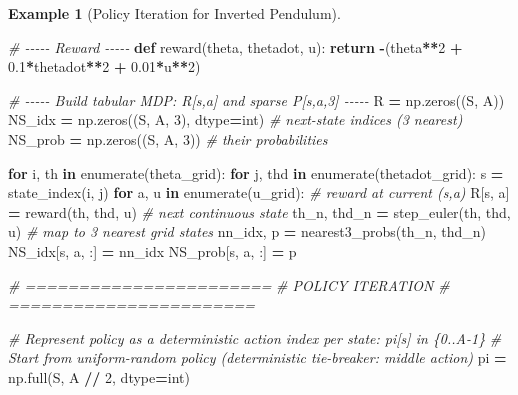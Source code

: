 \documentclass[
]{book}
\newenvironment{Shaded}{\begin{snugshade}}{\end{snugshade}}
\newcommand{\BuiltInTok}[1]{#1}
\newcommand{\CommentTok}[1]{\textcolor[rgb]{0.56,0.35,0.01}{\textit{#1}}}
\newcommand{\ControlFlowTok}[1]{\textcolor[rgb]{0.13,0.29,0.53}{\textbf{#1}}}
\newcommand{\DecValTok}[1]{\textcolor[rgb]{0.00,0.00,0.81}{#1}}
\newcommand{\FloatTok}[1]{\textcolor[rgb]{0.00,0.00,0.81}{#1}}
\newcommand{\KeywordTok}[1]{\textcolor[rgb]{0.13,0.29,0.53}{\textbf{#1}}}
\newcommand{\NormalTok}[1]{#1}
\newcommand{\OperatorTok}[1]{\textcolor[rgb]{0.81,0.36,0.00}{\textbf{#1}}}
\theoremstyle{definition}
\theoremstyle{definition}
\newtheorem{example}{Example}[chapter]
\theoremstyle{definition}
\theoremstyle{definition}
\theoremstyle{remark}
\begin{document}
\begin{example}[Policy Iteration for Inverted Pendulum]
\begin{Shaded}
\begin{Highlighting}[]
\CommentTok{\# {-}{-}{-}{-}{-} Reward {-}{-}{-}{-}{-}}
\KeywordTok{def}\NormalTok{ reward(theta, thetadot, u):}
    \ControlFlowTok{return} \OperatorTok{{-}}\NormalTok{(theta}\OperatorTok{**}\DecValTok{2} \OperatorTok{+} \FloatTok{0.1}\OperatorTok{*}\NormalTok{thetadot}\OperatorTok{**}\DecValTok{2} \OperatorTok{+} \FloatTok{0.01}\OperatorTok{*}\NormalTok{u}\OperatorTok{**}\DecValTok{2}\NormalTok{)}

\CommentTok{\# {-}{-}{-}{-}{-} Build tabular MDP: R[s,a] and sparse P[s,a,3] {-}{-}{-}{-}{-}}
\NormalTok{R }\OperatorTok{=}\NormalTok{ np.zeros((S, A))}
\NormalTok{NS\_idx }\OperatorTok{=}\NormalTok{ np.zeros((S, A, }\DecValTok{3}\NormalTok{), dtype}\OperatorTok{=}\BuiltInTok{int}\NormalTok{)   }\CommentTok{\# next{-}state indices (3 nearest)}
\NormalTok{NS\_prob }\OperatorTok{=}\NormalTok{ np.zeros((S, A, }\DecValTok{3}\NormalTok{))             }\CommentTok{\# their probabilities}

\ControlFlowTok{for}\NormalTok{ i, th }\KeywordTok{in} \BuiltInTok{enumerate}\NormalTok{(theta\_grid):}
    \ControlFlowTok{for}\NormalTok{ j, thd }\KeywordTok{in} \BuiltInTok{enumerate}\NormalTok{(thetadot\_grid):}
\NormalTok{        s }\OperatorTok{=}\NormalTok{ state\_index(i, j)}
        \ControlFlowTok{for}\NormalTok{ a, u }\KeywordTok{in} \BuiltInTok{enumerate}\NormalTok{(u\_grid):}
            \CommentTok{\# reward at current (s,a)}
\NormalTok{            R[s, a] }\OperatorTok{=}\NormalTok{ reward(th, thd, u)}
            \CommentTok{\# next continuous state}
\NormalTok{            th\_n, thd\_n }\OperatorTok{=}\NormalTok{ step\_euler(th, thd, u)}
            \CommentTok{\# map to 3 nearest grid states}
\NormalTok{            nn\_idx, p }\OperatorTok{=}\NormalTok{ nearest3\_probs(th\_n, thd\_n)}
\NormalTok{            NS\_idx[s, a, :] }\OperatorTok{=}\NormalTok{ nn\_idx}
\NormalTok{            NS\_prob[s, a, :] }\OperatorTok{=}\NormalTok{ p}

\CommentTok{\# =======================}
\CommentTok{\#     POLICY ITERATION}
\CommentTok{\# =======================}

\CommentTok{\# Represent policy as a deterministic action index per state: pi[s] in \{0..A{-}1\}}
\CommentTok{\# Start from uniform{-}random policy (deterministic tie{-}breaker: middle action)}
\NormalTok{pi }\OperatorTok{=}\NormalTok{ np.full(S, A }\OperatorTok{//} \DecValTok{2}\NormalTok{, dtype}\OperatorTok{=}\BuiltInTok{int}\NormalTok{)}


\end{Highlighting}
\end{Shaded}
\end{example}
\end{document}
